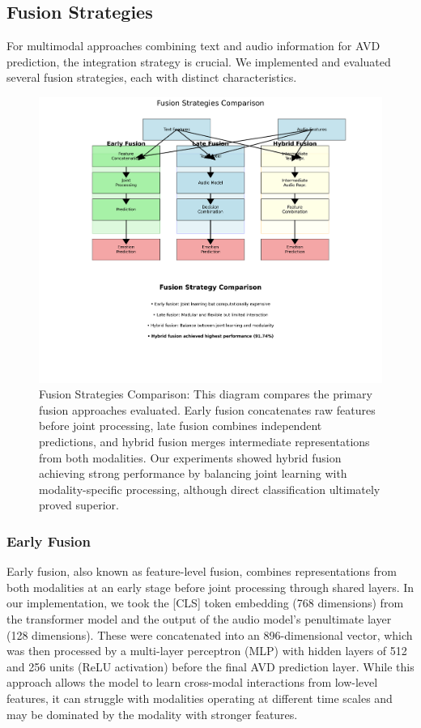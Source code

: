\documentclass[12pt]{article}
\begin{document}
\subsection{Fusion Strategies}
\label{subsec:fusion}
For multimodal approaches combining text and audio information for AVD prediction, the integration strategy is crucial. We implemented and evaluated several fusion strategies, each with distinct characteristics.

\begin{figure}[h]
    \centering
    \includegraphics[width=0.9\linewidth]{Figures/fusion_strategies_comparison.png}
    \caption{Fusion Strategies Comparison: This diagram compares the primary fusion approaches evaluated. Early fusion concatenates raw features before joint processing, late fusion combines independent predictions, and hybrid fusion merges intermediate representations from both modalities. Our experiments showed hybrid fusion achieving strong performance by balancing joint learning with modality-specific processing, although direct classification ultimately proved superior.}
    \label{fig:fusion_strategies}
\end{figure}

\subsubsection{Early Fusion}
Early fusion, also known as feature-level fusion, combines representations from both modalities at an early stage before joint processing through shared layers. In our implementation, we took the [CLS] token embedding (768 dimensions) from the transformer model and the output of the audio model's penultimate layer (128 dimensions). These were concatenated into an 896-dimensional vector, which was then processed by a multi-layer perceptron (MLP) with hidden layers of 512 and 256 units (ReLU activation) before the final AVD prediction layer. While this approach allows the model to learn cross-modal interactions from low-level features, it can struggle with modalities operating at different time scales and may be dominated by the modality with stronger features.
\end{document}
